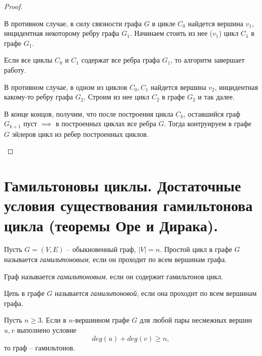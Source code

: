 \begin{proof}
\begin{itemize}
\begin{note}
                  В противном случае, в силу связности графа $ G $ в цикле $ C_0 $ найдется вершина $ v_1 $, инцидентная некоторому ребру графа $ G_1 $. Начинаем стоить из нее ($ v_1 $) цикл $ C_1 $ в графе $ G_1 $.
                  \begin{figure}[H]
                      \centering
                      \label{fig:fig_10}
                  \end{figure}

                  Если все циклы $ C_0 $ и $ C_1 $ содержат все ребра графа $ G_1 $, то алгоритм завершает работу.

                  В противном случае, в одном из циклов $ C_0,C_1 $ найдется вершина $ v_2 $, инцидентная какому-то ребру графа $ G_2 $. Строим из нее цикл $ C_2 $ в графе $ G_2 $ и так далее.

                  В конце концов, получим, что после построения цикла $ C_k $, оставшийся граф $ G_{k+1} $ пуст $ \implies $ в построенных циклах все ребра $ G $. Тогда контруируем в графе $ G $ эйлеров цикл из ребер построенных циклов.
              \end{note}
    \end{itemize}
\end{proof}

\section{Гамильтоновы циклы. Достаточные условия существования гамильтонова цикла (теоремы Оре и Дирака).}

\begin{definition}
    Пусть $ G = (V,E) $ -- обыкновенный граф, $ | V | = n  $. Простой цикл в графе $ G $ называется \emph{гамильтоновым}, если он проходит по всем вершинам графа.

    Граф называется \emph{гамильтоновым}, если он содержит гамильтонов цикл.
\end{definition}

\begin{definition}
    Цепь в графе $ G $ называется \emph{гамильтоновой}, если она проходит по всем вершинам графа.
\end{definition}

\begin{theorem}[Оре, 1960]
    Пусть $ n \geqslant 3 $. Если в $ n $-вершинном графе $ G $ для любой пары несмежных вершин $ u,v $ выполнено условие
    \[
        deg(u) + deg(v) \geqslant n,
    \]
    то граф -- гамильтонов.
\end{theorem}

